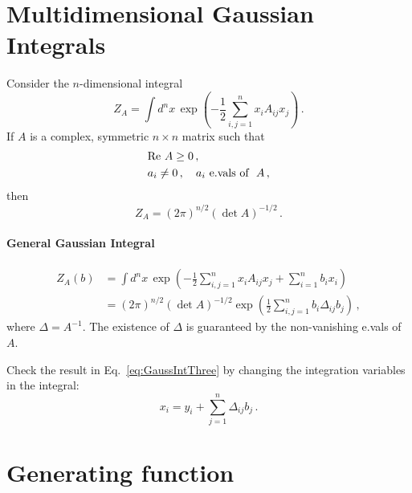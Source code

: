 \section{Multidimensional Gaussian Integrals}
\label{sec:mult-gauss-integr}

Consider the $n$-dimensional integral
\begin{equation}
  \label{eq:GaussIntOne}
  Z_A = \int d^nx\, \exp\left(
    -\frac12 \sum_{i,j=1}^n x_i A_{ij} x_j
    \right)\, .
\end{equation}
If $A$ is a complex, symmetric $n\times n$ matrix such that
\begin{align}
  & \mathrm{Re}\ A \geq 0 \, ,\\
  & a_i \neq 0\, , \quad a_i\ \text{e.vals of }\ A\, ,
\end{align}
then 
\begin{equation}
  \label{eq:GaussIntTwo}
  Z_A = \left(2\pi\right)^{n/2} \left(\det A \right)^{-1/2}\, .
\end{equation}

\paragraph{General Gaussian Integral}

\begin{align}
  Z_A(b) &= \int d^nx\, \exp\left(
  -\frac12 \sum_{i,j=1}^n x_i A_{ij} x_j
  + \sum_{i=1}^n b_i x_i
  \right) \\
  \label{eq:GaussIntThree}
  &=  \left(2\pi\right)^{n/2} \left(\det A \right)^{-1/2}
    \exp\left(
  \frac12 \sum_{i,j=1}^n b_i \Delta_{ij} b_j
  \right) \, ,
\end{align}
where $\Delta = A^{-1}$. The existence of $\Delta$ is guaranteed by the non-vanishing e.vals of $A$.
\begin{Ex}
  Check the result in Eq.~\ref{eq:GaussIntThree} by changing the integration variables in the integral:
  \[
    x_i = y_i + \sum_{j=1}^n \Delta_{ij} b_j\, .
  \]
\end{Ex}

\section{Generating function}
\label{sec:generating-function}

